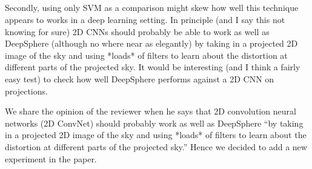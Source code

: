 \documentclass[12pt,a4paper]{article}
\newcommand{\nati}[1]{{\color[rgb]{.1,.6,.1}{NP: #1}}}
\newcommand{\mdeff}[1]{{\color[rgb]{.1,.6,.1}{MD: #1}}}
\newcommand{\todo}[1]{{\color[rgb]{.6,.1,.6}{TODO: #1}}}
\newcommand{\1}{\b{1}}              %
\newcommand{\0}{\b{0}}              %
\begin{document}


\mdeff{measure the computational time of filtering on a 1/12, 1/48 or 1/192 of the sphere with the graph. Add the result to Figure 4 and compare with filtering of the full sphere (with SHT and graph).}

\subsection{}

\begin{mdframed}[style=comment]
Secondly, using only SVM as a comparison might skew how well this technique appears to works in a deep learning setting. In principle (and I say this not knowing for sure) 2D CNNs should probably be able to work as well as DeepSphere (although no where near as elegantly) by taking in a projected 2D image of the sky and using *loads* of filters to learn about the distortion at different parts of the projected sky. It would be interesting (and I think a fairly easy test) to check how well DeepSphere performs against a 2D CNN on projections.
\end{mdframed}


We share the opinion of the reviewer when he says that 2D convolution neural networks (2D ConvNet) should probably work as well as DeepSphere ``by taking in a projected 2D image of the sky and using *loads* of filters to learn about the distortion at different parts of the projected sky.'' Hence we decided to add a new experiment in the paper.
\end{document}
